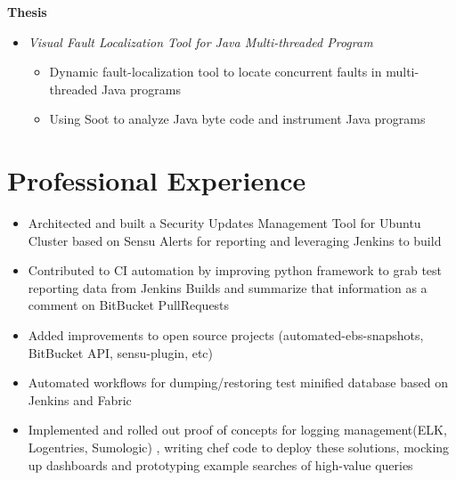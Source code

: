\documentclass{resume}
\begin{document}
\textbf{Thesis}
\begin{itemize}
\item \textit{Visual Fault Localization Tool for Java Multi-threaded Program}
\begin{itemize}
\item Dynamic fault-localization tool to locate concurrent faults in multi-threaded Java programs
\item Using Soot to analyze Java byte code and instrument Java programs
\end{itemize}
\end{itemize}

%
%


\section{Professional Experience}
\begin{itemize}
\item Architected and built a Security Updates Management Tool for Ubuntu Cluster based on Sensu Alerts for reporting and leveraging Jenkins to build
\item Contributed to CI automation by improving python framework to grab test reporting data from Jenkins Builds and summarize that information as a comment on BitBucket PullRequests
\item Added improvements to open source projects (automated-ebs-snapshots, BitBucket API, sensu-plugin, etc)
\item Automated workflows for dumping/restoring test minified database based on Jenkins and Fabric
\item Implemented and rolled out proof of concepts for logging management(ELK, Logentries, Sumologic)
, writing chef code to deploy these solutions, mocking up dashboards and prototyping example searches of high-value queries
\end{itemize}
\end{document}
